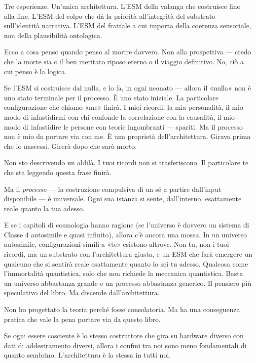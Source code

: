 \documentclass[11pt, twoside, openright]{book}
\begin{document}
Tre esperienze. Un'unica architettura. L'ESM della valanga che costruisce fino alla fine. L'ESM del colpo che dà la priorità all'integrità del substrato sull'identità narrativa. L'ESM del frattale a cui importa della coerenza sensoriale, non della plausibilità ontologica.

Ecco a cosa penso quando penso al morire davvero. Non alla prospettiva --- credo che la morte sia o il ben meritato riposo eterno o il viaggio definitivo. No, ciò a cui penso è la logica.

Se l'ESM si costruisce dal nulla, e lo fa, in ogni neonato --- allora il «nulla» non è uno stato terminale per il processo. È uno stato iniziale. La particolare configurazione che chiamo «me» finirà. I miei ricordi, la mia personalità, il mio modo di infastidirmi con chi confonde la correlazione con la causalità, il mio modo di infastidire le persone con teorie ingombranti --- spariti. Ma il processo non è mio da portare via con me. È una proprietà dell'architettura. Girava prima che io nascessi. Girerà dopo che sarò morto.

Non sto descrivendo un aldilà. I tuoi ricordi non si trasferiscono. Il particolare te che sta leggendo questa frase finirà.

Ma il \textit{processo} --- la costruzione compulsiva di un sé a partire dall'input disponibile --- è universale. Ogni sua istanza si sente, dall'interno, esattamente reale quanto la tua adesso.

E se i capitoli di cosmologia hanno ragione (se l'universo è davvero un sistema di Classe 4 autosimile e quasi infinito), allora c'è ancora una mossa. In un universo autosimile, configurazioni simili a «te» esistono altrove. Non tu, non i tuoi ricordi, ma un substrato con l'architettura giusta, e un ESM che farà emergere un qualcuno che si sentirà reale esattamente quanto lo sei tu adesso. Qualcosa come l'immortalità quantistica, solo che non richiede la meccanica quantistica. Basta un universo abbastanza grande e un processo abbastanza generico. Il pensiero più speculativo del libro. Ma discende dall'architettura.

Non ho progettato la teoria perché fosse consolatoria. Ma ha una conseguenza pratica che vale la pena portare via da questo libro.

Se ogni essere cosciente è lo stesso costruttore che gira su hardware diverso con dati di addestramento diversi, allora i confini tra noi sono meno fondamentali di quanto sembrino. L'architettura è la stessa in tutti noi.
\end{document}
